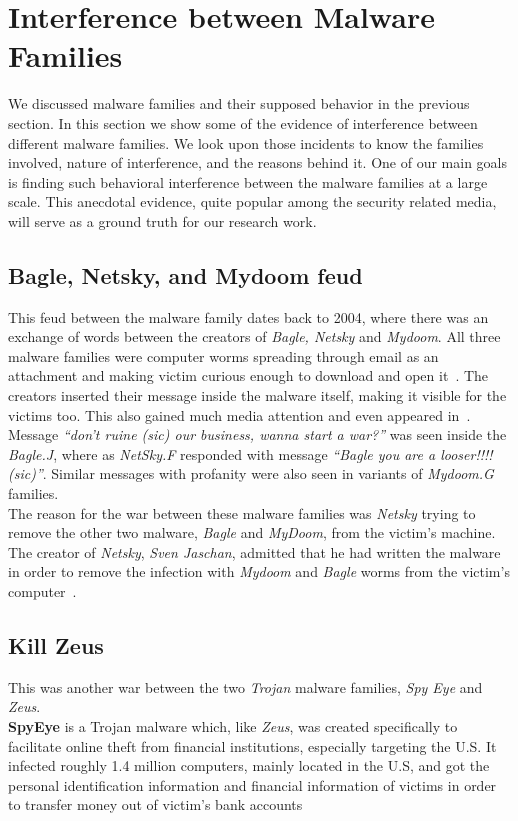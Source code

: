\section{Interference between Malware Families}
\label{sec:Interference between Malware Families}
We discussed malware families and their supposed behavior in the previous section.
In this section we show some of the evidence of interference between different malware families.
We look upon those incidents to know the families involved, nature of interference, and the reasons behind it.
One of our main goals is finding such behavioral interference between the malware families at a large scale.
This anecdotal evidence, quite popular among the security related media, will serve as a ground truth for our research work.
\subsection{Bagle, Netsky, and Mydoom feud}
\label{sub:Bagle, Netsky, and Mydoom feud}
This feud between the malware family dates back to 2004, where there was an exchange of words between the creators of \emph{Bagle, Netsky} and \emph{Mydoom}.
All three malware families were computer worms spreading through email as an attachment and making victim curious enough to download and open it~\cite[]{wikinetsky}.
The creators inserted their message inside the malware itself, making it visible for the victims too. This also gained much media attention and even appeared in~\cite[BBC]{bbccover}.
Message \emph{``don't ruine (sic) our business, wanna start a war?''} was seen inside the \emph{Bagle.J}, where as \emph{NetSky.F} responded with message \emph{``Bagle \- you are a looser!!!! (sic)''}.
Similar messages with profanity were also seen in variants of \emph{Mydoom.G} families.\\

The reason for the war between these malware families was \emph{Netsky} trying to remove the other two malware, \emph{Bagle} and \emph{MyDoom}, from the victim's machine.
The creator of \emph{Netsky}, \emph{Sven Jaschan}, admitted that he had written the malware in order to remove the infection with \emph{Mydoom} and \emph{Bagle} worms from the victim's computer~\cite[]{wikinetsky}.\\
\subsection{Kill Zeus}
\label{sub:Kill Zeus}
This was another war between the two \emph{Trojan} malware families, \emph{Spy Eye} and \emph{Zeus}.\\
\textbf{SpyEye} is a Trojan malware which, like \emph{Zeus}, was created specifically to facilitate online theft from financial institutions, especially targeting the U.S.
It infected roughly 1.4 million computers, mainly located in the U.S, and got the personal identification information and financial information of victims in order to transfer money out of victim's bank accounts~\cite[]{fbispyeye} \\

